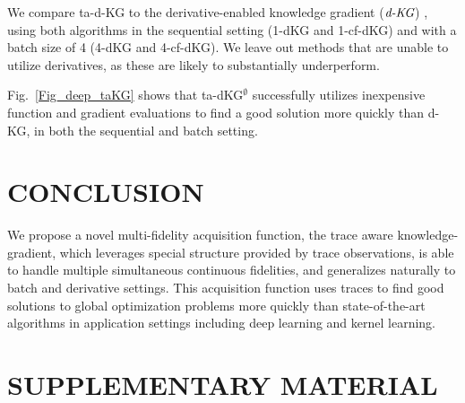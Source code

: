 \documentclass[letterpaper]{article}
\newcommand{\qKGg}{\text{\it d-KG}}
\newcommand{\taKG}{\text{taKG}}
\newcommand{\taKGE}{\text{taKG}^\emptyset}
\numberwithin{equation}{section}
\begin{document}
We compare ta-d-KG to the derivative-enabled knowledge gradient ($\qKGg$) \citep{wu2017bayesian}, using both algorithms in the sequential setting (1-dKG and 1-cf-dKG) and with a batch size of 4 (4-dKG and 4-cf-dKG).  We leave out methods that are unable to utilize derivatives, as these are likely to substantially underperform.

Fig.~\ref{Fig_deep_taKG} shows that ta-dKG$^\emptyset$ successfully utilizes inexpensive function and gradient evaluations to find a good solution more quickly than d-KG, in both the sequential and batch setting.




\section{CONCLUSION}
\label{sect:conclusion}
We propose a novel multi-fidelity acquisition function, the trace aware knowledge-gradient, which 
leverages special structure provided by trace observations,
is able to handle multiple simultaneous continuous fidelities, and 
generalizes naturally to batch and derivative settings.
This acquisition function uses traces to find 
good solutions to global optimization problems more quickly than state-of-the-art algorithms
in application settings including deep learning and kernel learning.







\newpage


\section{SUPPLEMENTARY MATERIAL}
\end{document}
